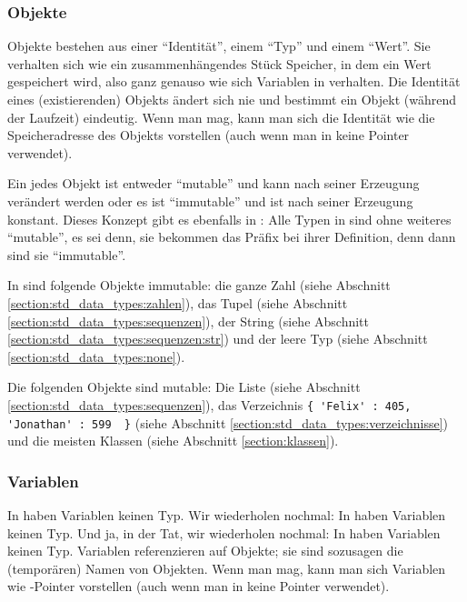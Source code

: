 \subsubsection{Objekte}
\label{section:datamodel:python:objekte}
Objekte bestehen aus einer ``Identität'', einem ``Typ'' und einem ``Wert''.
Sie verhalten sich wie ein zusammenhängendes Stück Speicher, in dem ein Wert gespeichert wird,
also ganz genauso wie sich Variablen in \CC verhalten.
Die Identität eines (existierenden) Objekts ändert sich nie und bestimmt ein Objekt (während der Laufzeit) eindeutig.
Wenn man mag, kann man sich die Identität wie die Speicheradresse des Objekts vorstellen (auch wenn man in \Python keine Pointer verwendet).

Ein jedes Objekt ist entweder ``mutable'' und kann nach seiner Erzeugung verändert werden oder es ist ``immutable'' und ist nach seiner Erzeugung konstant.
Dieses Konzept gibt es ebenfalls in \CC:
Alle Typen in \CC sind ohne weiteres ``mutable'', es sei denn, sie bekommen das Präfix  bei ihrer Definition, denn dann sind sie ``immutable''.

In \Python sind folgende Objekte immutable:
die ganze Zahl  (siehe Abschnitt \ref{section:std_data_types:zahlen}),
das Tupel  (siehe Abschnitt \ref{section:std_data_types:sequenzen}),
der String  (siehe Abschnitt \ref{section:std_data_types:sequenzen:str}) und
der leere Typ  (siehe Abschnitt \ref{section:std_data_types:none}).

Die folgenden Objekte sind mutable:
Die Liste \lpy{[1, 'a']} (siehe Abschnitt \ref{section:std_data_types:sequenzen}),
das Verzeichnis \lstinline[style=Pyinline]|{ 'Felix' : 405, 'Jonathan' : 599  }| (siehe Abschnitt \ref{section:std_data_types:verzeichnisse})
und die meisten Klassen (siehe Abschnitt \ref{section:klassen}).


\subsubsection{Variablen}
\label{section:datamodel:python:variablen}
In \Python haben Variablen keinen Typ.
Wir wiederholen nochmal: In \Python haben Variablen keinen Typ.
Und ja, in der Tat, wir wiederholen nochmal: In \Python haben Variablen keinen Typ.
Variablen referenzieren auf Objekte; sie sind sozusagen die (temporären) Namen von Objekten.
Wenn man mag, kann man sich Variablen wie -Pointer vorstellen (auch wenn man in \Python keine Pointer verwendet).

